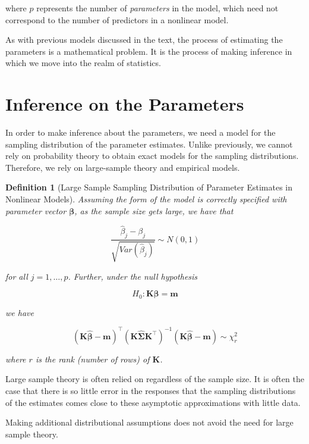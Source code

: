 \documentclass[
]{book}
\theoremstyle{plain}
\theoremstyle{mydefn}
\newtheorem{definition}{Definition}[chapter]
\theoremstyle{myexmpl}
\theoremstyle{remark}
\begin{document}
where \(p\) represents the number of \emph{parameters} in the model, which need not correspond to the number of predictors in a nonlinear model.

As with previous models discussed in the text, the process of estimating the parameters is a mathematical problem. It is the process of making inference in which we move into the realm of statistics.

\hypertarget{inference-on-the-parameters}{%
\section{Inference on the Parameters}\label{inference-on-the-parameters}}

In order to make inference about the parameters, we need a model for the sampling distribution of the parameter estimates. Unlike previously, we cannot rely on probability theory to obtain exact models for the sampling distributions. Therefore, we rely on large-sample theory and empirical models.

\begin{definition}[Large Sample Sampling Distribution of Parameter Estimates in Nonlinear Models]
Assuming the form of the model is correctly specified with parameter vector \(\boldsymbol{\beta}\), as the sample size gets large, we have that

\[\frac{\widehat{\beta}_j - \beta_j}{\sqrt{Var\left(\widehat{\beta}_j\right)}} \sim N(0, 1)\]

for all \(j = 1, \dotsc, p\). Further, under the null hypothesis

\[H_0: \mathbf{K}\boldsymbol{\beta} = \mathbf{m}\]

we have

\[\left(\mathbf{K}\widehat{\boldsymbol{\beta}} - \mathbf{m}\right)^\top \left(\mathbf{K}\widehat{\boldsymbol{\Sigma}}\mathbf{K}^\top\right)^{-1} \left(\mathbf{K}\widehat{\boldsymbol{\beta}} - \mathbf{m}\right) \sim \chi^2_r\]

where \(r\) is the rank (number of rows) of \(\mathbf{K}\).
\end{definition}

\begin{rmdtip}
Large sample theory is often relied on regardless of the sample size. It is often the case that there is so little error in the responses that the sampling distributions of the estimates comes close to these asymptotic approximations with little data.

Making additional distributional assumptions does not avoid the need for large sample theory.
\end{rmdtip}
\end{document}
